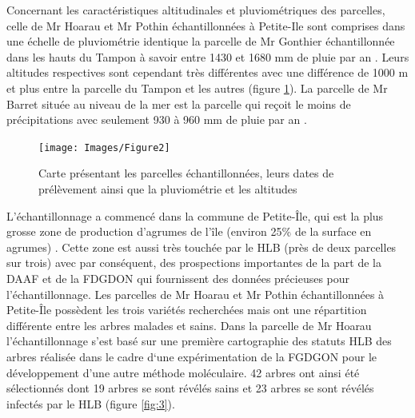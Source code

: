 \documentclass[
  11pt,
  french,
  a4paper,
  extrafontsizes,onecolumn,openright
  ]{memoir}
\begin{document}
Concernant les caractéristiques altitudinales et pluviométriques des parcelles, celle de Mr Hoarau et Mr Pothin échantillonnées à Petite-Ile sont comprises dans une échelle de pluviométrie identique la parcelle de Mr Gonthier échantillonnée dans les hauts du Tampon à savoir entre 1430 et 1680 mm de pluie par an \autocite{equipe_artists_-_ur_aida_meteor_2021}. Leurs altitudes respectives sont cependant très différentes avec une différence de 1000 m et plus entre la parcelle du Tampon et les autres (figure \ref{fig:2}). La parcelle de Mr Barret située au niveau de la mer est la parcelle qui reçoit le moins de précipitations avec seulement 930 à 960 mm de pluie par an \autocite{equipe_artists_-_ur_aida_meteor_2021}.

\scriptsize

\begin{figure}

{\centering \texttt{[image: Images/Figure2]} 

}

\caption{Carte présentant les parcelles échantillonnées, leurs dates de prélèvement ainsi que la pluviométrie et les altitudes}\label{fig:2}
\end{figure}

\normalsize

L'échantillonnage a commencé dans la commune de Petite-Île, qui est la plus grosse zone de production d'agrumes de l'île (environ 25\% de la surface en agrumes) \autocite{guilloteau_utilisation_2018}. Cette zone est aussi très touchée par le HLB (près de deux parcelles sur trois) avec par conséquent, des prospections importantes de la part de la DAAF et de la FDGDON qui fournissent des données précieuses pour l'échantillonnage. Les parcelles de Mr Hoarau et Mr Pothin échantillonnées à Petite-Île possèdent les trois variétés recherchées mais ont une répartition différente entre les arbres malades et sains.
\vfill
\newpage
Dans la parcelle de Mr Hoarau l'échantillonnage s'est basé sur une première cartographie des statuts HLB des arbres réalisée dans le cadre d`une expérimentation de la FGDGON pour le développement d'une autre méthode moléculaire. 42 arbres ont ainsi été sélectionnés dont 19 arbres se sont révélés sains et 23 arbres se sont révélés infectés par le HLB (figure \ref{fig:3}).

\scriptsize
\end{document}
